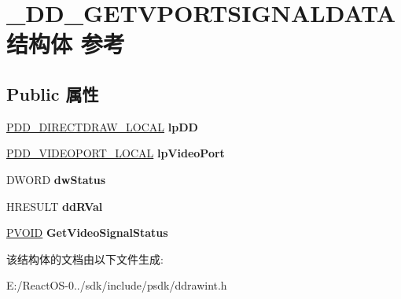\hypertarget{struct___d_d___g_e_t_v_p_o_r_t_s_i_g_n_a_l_d_a_t_a}{}\section{\+\_\+\+D\+D\+\_\+\+G\+E\+T\+V\+P\+O\+R\+T\+S\+I\+G\+N\+A\+L\+D\+A\+T\+A结构体 参考}
\label{struct___d_d___g_e_t_v_p_o_r_t_s_i_g_n_a_l_d_a_t_a}
\subsection*{Public 属性}
\begin{DoxyCompactItemize}
\item 
\mbox{\label{struct___d_d___g_e_t_v_p_o_r_t_s_i_g_n_a_l_d_a_t_a_a4a1017943cb5aac25e9bcf311529336f}} 
\hyperlink{struct___d_d___d_i_r_e_c_t_d_r_a_w___l_o_c_a_l}{P\+D\+D\+\_\+\+D\+I\+R\+E\+C\+T\+D\+R\+A\+W\+\_\+\+L\+O\+C\+AL} {\bfseries lp\+DD}
\item 
\mbox{\label{struct___d_d___g_e_t_v_p_o_r_t_s_i_g_n_a_l_d_a_t_a_a860a691bd24ba05b5ffa2766968f5b25}} 
\hyperlink{struct___d_d___v_i_d_e_o_p_o_r_t___l_o_c_a_l}{P\+D\+D\+\_\+\+V\+I\+D\+E\+O\+P\+O\+R\+T\+\_\+\+L\+O\+C\+AL} {\bfseries lp\+Video\+Port}
\item 
\mbox{\label{struct___d_d___g_e_t_v_p_o_r_t_s_i_g_n_a_l_d_a_t_a_aaa0eab758fdac2672c233729ed946df7}} 
D\+W\+O\+RD {\bfseries dw\+Status}
\item 
\mbox{\label{struct___d_d___g_e_t_v_p_o_r_t_s_i_g_n_a_l_d_a_t_a_adc97768ca7171c9a26e1e62fc30d6300}} 
H\+R\+E\+S\+U\+LT {\bfseries dd\+R\+Val}
\item 
\mbox{\label{struct___d_d___g_e_t_v_p_o_r_t_s_i_g_n_a_l_d_a_t_a_a62d89cd9c34820def2350407533d39d7}} 
\hyperlink{interfacevoid}{P\+V\+O\+ID} {\bfseries Get\+Video\+Signal\+Status}
\end{DoxyCompactItemize}


该结构体的文档由以下文件生成\+:\begin{DoxyCompactItemize}
\item 
E\+:/\+React\+O\+S-\/0../sdk/include/psdk/ddrawint.\+h\end{DoxyCompactItemize}
